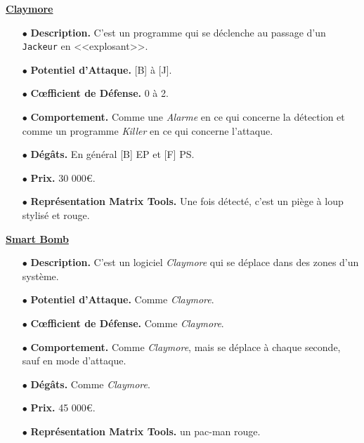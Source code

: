 \documentclass[11pt,twoside,a4paper]{article}
\begin{document}
\begin{multicols*}{2}
\underline{\textbf{Claymore}} %
\begin{itemize}
	\item[$\bullet$] \textbf{Description. }C'est un programme qui se d{\'e}clenche au passage d'un \texttt{Jackeur} en <<explosant>>. 
	\item[$\bullet$] \textbf{Potentiel d'Attaque. }[B] {\`a} [J]. 
	\item[$\bullet$] \textbf{C\oe fficient de D{\'e}fense. }0 {\`a} 2. 
	\item[$\bullet$] \textbf{Comportement. }Comme une \emph{Alarme} en ce qui concerne la d{\'e}tection et comme un programme \emph{Killer} en ce qui concerne l'attaque. 
	\item[$\bullet$] \textbf{D{\'e}g{\^a}ts. }En g{\'e}n{\'e}ral [B] EP et [F] PS. 
	\item[$\bullet$] \textbf{Prix. }30 000\euro . 
	\item[$\bullet$] \textbf{Repr{\'e}sentation Matrix Tools. }Une fois d{\'e}tect{\'e}, c'est un pi{\`e}ge {\`a} loup stylis{\'e} et rouge. 
\end{itemize} %

\underline{\textbf{Smart Bomb}} %
\begin{itemize}
	\item[$\bullet$] \textbf{Description. }C'est un logiciel \emph{Claymore} qui se d{\'e}place dans des zones d'un syst{\`e}me. 
	\item[$\bullet$] \textbf{Potentiel d'Attaque. }Comme \emph{Claymore}. 
	\item[$\bullet$] \textbf{C\oe fficient de D{\'e}fense. }Comme \emph{Claymore}. 
	\item[$\bullet$] \textbf{Comportement. }Comme \emph{Claymore}, mais se d{\'e}place {\`a} chaque seconde, sauf en mode d'attaque. 
	\item[$\bullet$] \textbf{D{\'e}g{\^a}ts. }Comme \emph{Claymore}. 
	\item[$\bullet$] \textbf{Prix. }45 000\euro . 
	\item[$\bullet$] \textbf{Repr{\'e}sentation Matrix Tools. }un pac-man rouge. 
\end{itemize} %


\end{multicols*}
\end{document}
